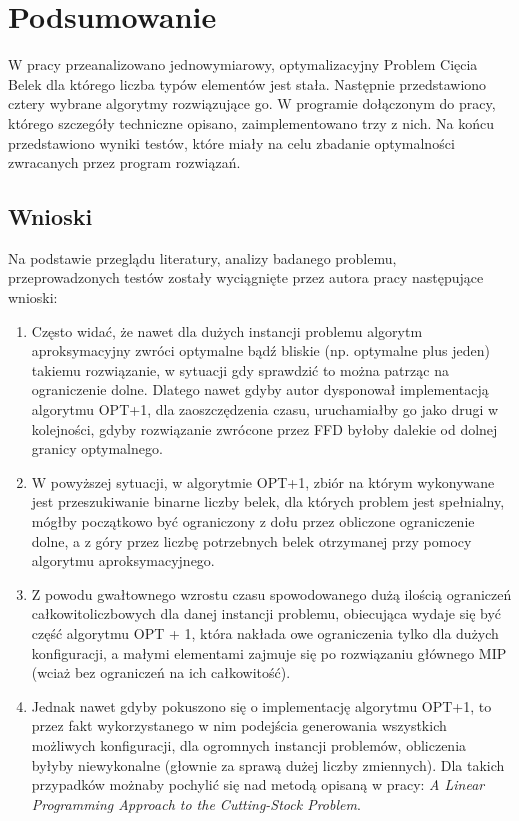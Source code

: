 \chapter{Podsumowanie}
\thispagestyle{chapterBeginStyle}
\label{ch:SUMMARY}

W pracy przeanalizowano jednowymiarowy, optymalizacyjny Problem Cięcia Belek dla którego liczba typów elementów jest stała. 
Następnie przedstawiono cztery wybrane algorytmy rozwiązujące go. W programie dołączonym do pracy, którego szczegóły techniczne opisano, zaimplementowano trzy z nich. Na końcu przedstawiono wyniki testów, które miały na celu zbadanie optymalności zwracanych przez program rozwiązań.

\section{Wnioski}
Na podstawie przeglądu literatury, analizy badanego problemu, przeprowadzonych testów zostały wyciągnięte  przez autora pracy następujące wnioski:
\begin{enumerate}
	\item Często widać, że nawet dla dużych instancji problemu algorytm aproksymacyjny zwróci optymalne bądź bliskie (np. optymalne plus jeden) takiemu rozwiązanie, w sytuacji gdy sprawdzić to można patrząc na ograniczenie dolne. Dlatego nawet gdyby autor dysponował implementacją algorytmu OPT+1, dla zaoszczędzenia czasu, uruchamiałby go jako drugi w kolejności, gdyby rozwiązanie zwrócone przez FFD byłoby dalekie od dolnej granicy optymalnego.
	\item W powyższej sytuacji, w algorytmie OPT+1, zbiór na którym wykonywane jest przeszukiwanie binarne liczby belek, dla których problem jest spełnialny, mógłby początkowo być ograniczony z dołu przez obliczone ograniczenie dolne, a z góry przez liczbę potrzebnych belek otrzymanej przy pomocy algorytmu aproksymacyjnego.
	\item Z powodu gwałtownego wzrostu czasu spowodowanego dużą ilością ograniczeń całkowitoliczbowych dla danej instancji problemu, obiecująca wydaje się być część algorytmu OPT + 1, która nakłada owe ograniczenia tylko dla dużych konfiguracji, a małymi elementami zajmuje się po rozwiązaniu głównego MIP (wciaż bez ograniczeń na ich całkowitość).
	\item Jednak nawet gdyby pokuszono się o implementację algorytmu OPT+1, to przez fakt wykorzystanego w nim podejścia generowania wszystkich możliwych konfiguracji, dla ogromnych instancji problemów, obliczenia byłyby niewykonalne (głownie za sprawą dużej liczby zmiennych). Dla takich przypadków możnaby pochylić się nad metodą opisaną w pracy: \textit{A Linear Programming Approach to the Cutting-Stock Problem}\cite{GOMORY}.

\end{enumerate}


